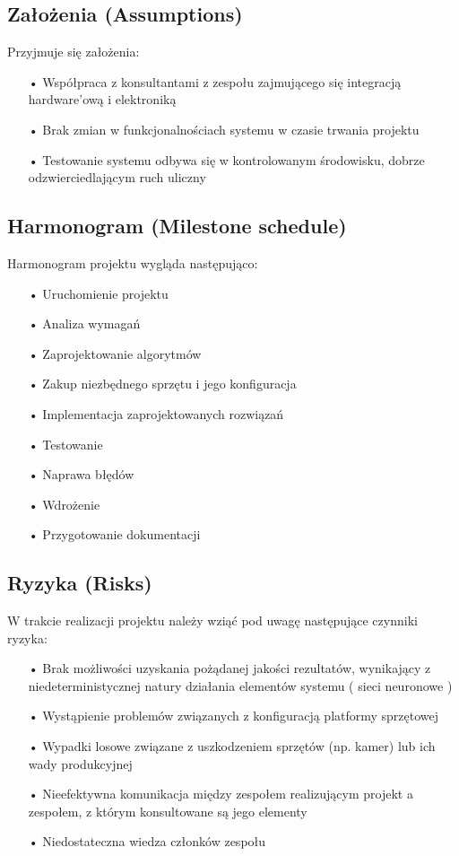 \subsection{Założenia (Assumptions)}
Przyjmuje się założenia:
\begin{itemize}
\item[•] Współpraca z konsultantami z zespołu zajmującego się integracją hardware'ową i elektroniką
\item[•] Brak zmian w funkcjonalnościach systemu w czasie trwania projektu
\item[•] Testowanie systemu odbywa się w kontrolowanym środowisku, dobrze odzwierciedlającym ruch uliczny
\end{itemize}
\subsection{Harmonogram (Milestone schedule)}
Harmonogram projektu wygląda następująco:
\begin{itemize}
\item[•] Uruchomienie projektu
\item[•] Analiza wymagań
\item[•] Zaprojektowanie algorytmów
\item[•] Zakup niezbędnego sprzętu i jego konfiguracja
\item[•] Implementacja zaprojektowanych rozwiązań
\item[•] Testowanie
\item[•] Naprawa błędów
\item[•] Wdrożenie
\item[•] Przygotowanie dokumentacji
\end{itemize}
\subsection{Ryzyka (Risks)}
W trakcie realizacji projektu należy wziąć pod uwagę następujące czynniki ryzyka:
\begin{itemize}
\item[•] Brak możliwości uzyskania pożądanej jakości rezultatów, wynikający z niedeterministycznej natury działania elementów systemu ( sieci neuronowe )
\item[•] Wystąpienie problemów związanych z konfiguracją platformy sprzętowej
\item[•] Wypadki losowe związane z uszkodzeniem sprzętów (np. kamer) lub ich wady produkcyjnej  
\item[•] Nieefektywna komunikacja między zespołem realizującym projekt a zespołem, z którym konsultowane są jego elementy
\item[•] Niedostateczna wiedza członków zespołu
\end{itemize}
